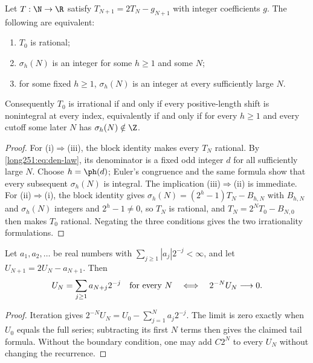 \begin{theorem}\label{long251:res:escape-irrational}
Let $T:\N\to\R$ satisfy $T_{N+1}=2T_N-g_{N+1}$ with integer coefficients $g$.  The
following are equivalent:
\begin{enumerate}[label=\textup{(\roman*)}]
\item $T_0$ is rational;
\item $\sigma_h(N)$ is an integer for some $h\ge1$ and some $N$;
\item for some fixed $h\ge1$, $\sigma_h(N)$ is an integer at every
  sufficiently large $N$.
\end{enumerate}
Consequently $T_0$ is irrational if and only if every positive-length shift is
nonintegral at every index, equivalently if and only if for every $h\ge1$ and
every cutoff some later $N$ has $\sigma_h(N)\notin\Z$.
\end{theorem}

\begin{proof}
For \textup{(i)}$\Rightarrow$\textup{(iii)}, the block identity makes every
$T_N$ rational.  By \eqref{long251:eq:den-law}, its denominator is a fixed
odd integer $d$ for all sufficiently large $N$.  Choose $h=\ph(d)$;
Euler's congruence and the same formula show that every subsequent
$\sigma_h(N)$ is integral.  The implication
\textup{(iii)}$\Rightarrow$\textup{(ii)} is immediate.  For
\textup{(ii)}$\Rightarrow$\textup{(i)}, the block identity gives
$\sigma_h(N)=(2^h-1)T_N-B_{h,N}$ with $B_{h,N}$ and $\sigma_h(N)$ integers and
$2^h-1\ne0$, so $T_N$ is rational, and $T_N=2^NT_0-B_{N,0}$ then makes $T_0$
rational.  Negating the three conditions gives the two irrationality
formulations.
\end{proof}

\begin{lemma}\label{long251:res:true-tail}
Let $a_1,a_2,\ldots$ be real numbers with
$\sum_{j\ge1}|a_j|2^{-j}<\infty$, and let $U_{N+1}=2U_N-a_{N+1}$.
Then
\[
 U_N=\sum_{j\ge1}a_{N+j}2^{-j}\quad\hbox{for every }N
 \quad\Longleftrightarrow\quad 2^{-N}U_N\longrightarrow0.
\]
\end{lemma}
\begin{proof}
Iteration gives
$2^{-N}U_N=U_0-\sum_{j=1}^{N}a_j2^{-j}$.
The limit is zero exactly when $U_0$ equals the full series; subtracting
its first $N$ terms then gives the claimed tail formula.  Without the boundary condition,
one may add $C2^N$ to every $U_N$ without changing the recurrence.
\end{proof}

